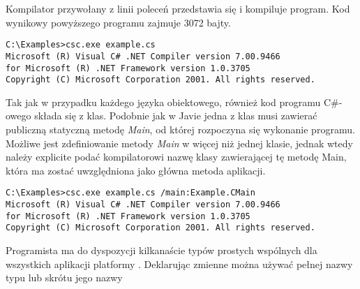 Kompilator przywołany z linii poleceń przedstawia się i kompiluje program. 
Kod wynikowy powyższego programu zajmuje 3072 bajty. 

\begin{scriptsize}
\begin{verbatim}
C:\Examples>csc.exe example.cs
Microsoft (R) Visual C# .NET Compiler version 7.00.9466
for Microsoft (R) .NET Framework version 1.0.3705
Copyright (C) Microsoft Corporation 2001. All rights reserved.

\end{verbatim}
\end{scriptsize}

Tak jak w przypadku każdego języka obiektowego, również kod programu C\#-owego składa się z klas.
Podobnie jak w Javie jedna z klas musi zawierać publiczną statyczną metodę {\em Main}, od której
rozpoczyna się wykonanie programu. Możliwe jest zdefiniowanie metody {\em Main} w więcej
niż jednej klasie, jednak wtedy należy explicite podać kompilatorowi nazwę klasy zawierającej 
tę metodę Main, która ma zostać uwzględniona jako główna metoda aplikacji.
\label{main_wielerazy}

\begin{scriptsize}
\begin{verbatim}
C:\Examples>csc.exe example.cs /main:Example.CMain
Microsoft (R) Visual C# .NET Compiler version 7.00.9466
for Microsoft (R) .NET Framework version 1.0.3705
Copyright (C) Microsoft Corporation 2001. All rights reserved.

\end{verbatim}
\end{scriptsize}

Programista ma do dyspozycji kilkanaście typów prostych wspólnych dla wszystkich aplikacji 
platformy \NET. Deklarując zmienne można używać pełnej nazwy typu lub skrótu jego nazwy

